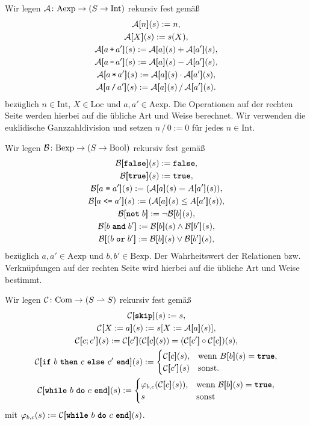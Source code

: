 Wir legen $\mathcal A\colon\mathrm{Aexp}\to (S\to\mathrm{Int})$ rekursiv fest gemäß
\begin{gather*}
\evA\qb{n}(s) := n,\\
\evA\qb{X}(s) := s(X),\\
\evA\qb{a\,\code{+}\,a'}(s) := \evA\qb{a}(s) + \evA\qb{a'}(s),\\
\evA\qb{a\,\code{-}\,a'}(s) := \evA\qb{a}(s) - \evA\qb{a'}(s),\\
\evA\qb{a\,\code{*}\,a'}(s) := \evA\qb{a}(s) \cdot \evA\qb{a'}(s),\\
\evA\qb{a\,\code{/}\,a'}(s) := \evA\qb{a}(s)\,/\, \evA\qb{a'}(s).
\end{gather*}
bezüglich $n\in\mathrm{Int}$, $X\in\mathrm{Loc}$ und $a,a'\in\mathrm{Aexp}$.
Die Operationen auf der rechten Seite werden hierbei auf die übliche
Art und Weise berechnet. Wir verwenden die euklidische Ganzzahldivision
und setzen $n\,/\,0:=0$ für jedes $n\in\mathrm{Int}$.

Wir legen $\mathcal B\colon\mathrm{Bexp}\to (S\to\mathrm{Bool})$ rekursiv fest gemäß
\begin{gather*}
\evB\qb{\kw{false}}(s) := \kw{false},\\
\evB\qb{\kw{true}}(s) := \kw{true},\\
\evB\qb{a \;\code{=}\; a'}(s) := (\evA\qb{a}(s) = A\qb{a'}(s)),\\
\evB\qb{a \;\code{<=}\; a'}(s) := (\evA\qb{a}(s)\le A\qb{a'}(s)),\\
\evB\qb{\kw{not}\;b} := \lnot\evB\qb{b}(s),\\
\evB\qb{b\;\kw{and}\;b'} := \evB\qb{b}(s)\land\evB\qb{b'}(s),\\
\evB\qb{(b\;\kw{or}\;b'} := \evB\qb{b}(s)\lor\evB\qb{b'}(s),
\end{gather*}
bezüglich $a,a'\in\mathrm{Aexp}$ und $b,b'\in\mathrm{Bexp}$. Der Wahrheitswert
der Relationen bzw. Verknüpfungen auf der rechten Seite wird hierbei auf die
übliche Art und Weise bestimmt.

Wir legen $\mathcal C\colon\mathrm{Com}\to (S\rightharpoonup S)$ rekursiv fest gemäß
\begin{gather*}
\evC\qb{\kw{skip}}(s) := s,\\
\evC\qb{X:=a}(s) := s[X:=\evA\qb{a}(s)],\\
\evC\qb{c; c'}(s) := \evC\qb{c'}(\evC\qb{c}(s)) = (\evC\qb{c'}\circ\evC\qb{c})(s),\\
\evC\qb{\text{\kw{if} $b$ \kw{then} $c$ \kw{else} $c'$ \kw{end}}}(s) := \begin{cases}
\evC\qb{c}(s),& \text{wenn $B\qb{b}(s)=\kw{true}$},\\
\evC\qb{c'}(s)& \text{sonst}.
\end{cases}\\
\evC\qb{\text{\kw{while} $b$ \kw{do} $c$ \kw{end}}}(s) := \begin{cases}
\varphi_{b,c}(\evC\qb{c}(s)),& \text{wenn $\evB\qb{b}(s)=\kw{true}$},\\
s & \text{sonst}
\end{cases}
\end{gather*}
mit $\varphi_{b,c}(s) := \evC\qb{\text{\kw{while} $b$ \kw{do} $c$ \kw{end}}}(s)$.

